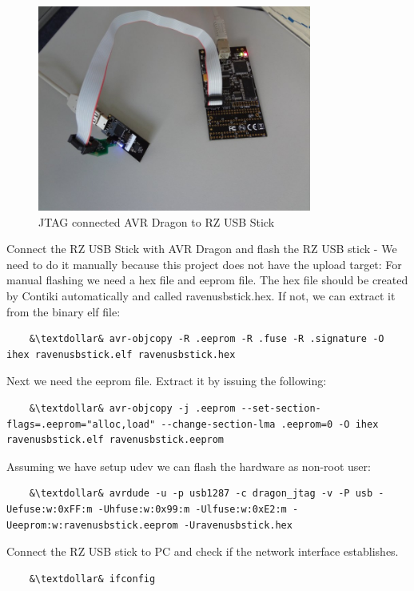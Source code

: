 \documentclass{article}
\begin{document}
\begin{figure}[H]
  \centering
  \includegraphics[width=9cm,keepaspectratio]{smallfig/DSC02595-small.jpeg}
  \caption{JTAG connected AVR Dragon to RZ USB Stick}
\end{figure}
Connect the RZ USB Stick with AVR Dragon and flash the RZ USB stick - We need to do it manually because this project does not have the upload target:
For manual flashing we need a hex file and eeprom file. The hex file should be created by Contiki automatically and called ravenusbstick.hex.
If not, we can extract it from the binary elf file:
\begin{lstlisting}
	&\textdollar& avr-objcopy -R .eeprom -R .fuse -R .signature -O ihex ravenusbstick.elf ravenusbstick.hex
\end{lstlisting}
Next we need the eeprom file. Extract it by issuing the following:
\begin{lstlisting}
	&\textdollar& avr-objcopy -j .eeprom --set-section-flags=.eeprom="alloc,load" --change-section-lma .eeprom=0 -O ihex ravenusbstick.elf ravenusbstick.eeprom
\end{lstlisting}
Assuming we have setup udev we can flash the hardware as non-root user:
\begin{lstlisting}
	&\textdollar& avrdude -u -p usb1287 -c dragon_jtag -v -P usb -Uefuse:w:0xFF:m -Uhfuse:w:0x99:m -Ulfuse:w:0xE2:m -Ueeprom:w:ravenusbstick.eeprom -Uravenusbstick.hex
\end{lstlisting}

Connect the RZ USB stick to PC and check if the network interface establishes.
\begin{lstlisting}
	&\textdollar& ifconfig
\end{lstlisting}
\end{document}
